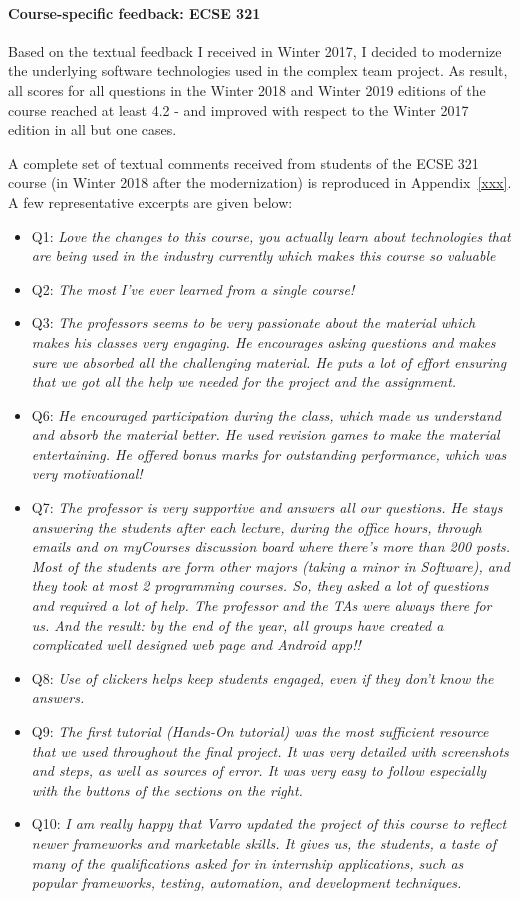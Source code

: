 \documentclass[a4paper,11pt]{report}
\begin{document}
\paragraph{Course-specific feedback: ECSE 321}
Based on the textual feedback I received in Winter 2017, I decided to modernize the underlying software technologies used in the complex team project. As result, all scores for all questions in the Winter 2018 and Winter 2019 editions of the course reached at least 4.2 - and improved with respect to the Winter 2017 edition in all but one cases. 

A complete set of textual comments received from students of the ECSE 321 course (in Winter 2018 after the modernization) is reproduced in Appendix~\ref{xxx}. A few representative excerpts are given below:
\begin{itemize}
\item Q1: \emph{ Love the changes to this course, you actually learn about technologies that are being used in the industry currently which makes this course so valuable }
\item Q2: \emph{The most I've ever learned from a single course! }
\item Q3: \emph{The professors seems to be very passionate about the material which makes his classes very engaging. He encourages asking questions and makes sure we absorbed all the challenging material. He puts a lot of effort ensuring that we got all the help we needed for the project and the assignment. }
\item Q6: \emph{He encouraged participation during the class, which made us understand and absorb the material better. He used revision games to make the material entertaining. He offered bonus marks for outstanding performance, which was very motivational! }
\item Q7: \emph{The professor is very supportive and answers all our questions. He stays answering the students after each lecture, during the office hours, through emails and on myCourses discussion board where there's more than 200 posts. Most of the students are form other majors (taking a minor in Software), and they took at most 2 programming courses. So, they asked a lot of questions and required a lot of help. The professor and the TAs were always there for us. And the result: by the end of the year, all groups have created a complicated well designed web page and Android app!! }
\item Q8: \emph{Use of clickers helps keep students engaged, even if they don't know the answers. }
\item Q9: \emph{The first tutorial (Hands-On tutorial) was the most sufficient resource that we used throughout the final project. It was very detailed with screenshots and steps, as well as sources of error. It was very easy to follow especially with the buttons of the sections on the right. }
\item Q10: \emph{ I am really happy that Varro updated the project of this course to reflect newer frameworks and marketable skills. It gives us, the students, a taste of many of the qualifications asked for in internship applications, such as popular frameworks, testing, automation, and development techniques. }
\end{itemize}
\end{document}
